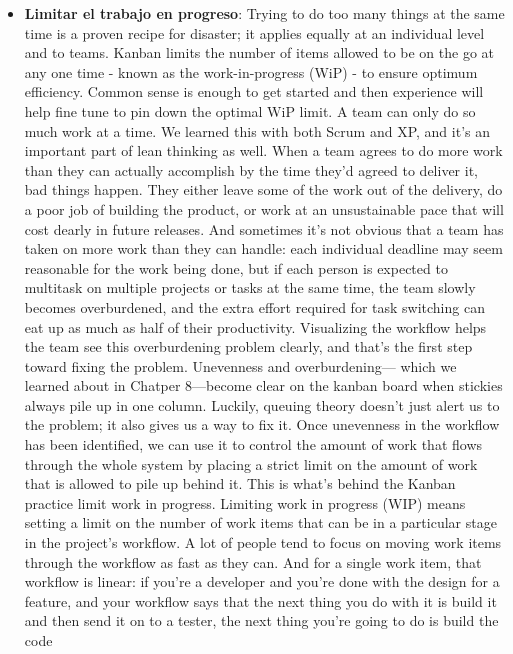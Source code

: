 \begin{itemize}
    \item \textbf{Limitar el trabajo en progreso}: %
    Trying to do too many things at
    the same time is a proven recipe for disaster; it applies equally
    at an individual level and to teams. Kanban limits the number
    of items allowed to be on the go at any one time - known as
    the work-in-progress (WiP) - to ensure optimum efficiency.
    Common sense is enough to get started and then experience
    will help fine tune to pin down the optimal WiP limit.
    A team can only do so much work at a time. We learned this with both Scrum and
    XP, and it's an important part of lean thinking as well. When a team agrees to do
    more work than they can actually accomplish by the time they'd agreed to deliver it,
    bad things happen. They either leave some of the work out of the delivery, do a poor
    job of building the product, or work at an unsustainable pace that will cost dearly in
    future releases. And sometimes it's not obvious that a team has taken on more work
    than they can handle: each individual deadline may seem reasonable for the work
    being done, but if each person is expected to multitask on multiple projects or tasks at
    the same time, the team slowly becomes overburdened, and the extra effort required
    for task switching can eat up as much as half of their productivity.
    Visualizing the workflow helps the team see this overburdening problem clearly, and
    that's the first step toward fixing the problem. Unevenness and overburdening—
    which we learned about in Chatper 8—become clear on the kanban board when
    stickies always pile up in one column. Luckily, queuing theory doesn't just alert us to
    the problem; it also gives us a way to fix it. Once unevenness in the workflow has
    been identified, we can use it to control the amount of work that flows through the
    whole system by placing a strict limit on the amount of work that is allowed to pile up
    behind it. This is what's behind the Kanban practice limit work in progress.
    Limiting work in progress (WIP) means setting a limit on the number of work items
    that can be in a particular stage in the project's workflow. A lot of people tend to focus
    on moving work items through the workflow as fast as they can. And for a single
    work item, that workflow is linear: if you're a developer and you're done with the
    design for a feature, and your workflow says that the next thing you do with it is build
    it and then send it on to a tester, the next thing you're going to do is build the code

\end{itemize}
